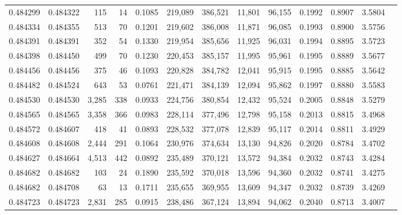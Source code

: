 \begin{tabular}{rrrrrrrrrrrrr}
0.484299 & 0.484322 &   115 &    14 &                                     0.1085 & 219,089 & 386,521 &  11,801 &  96,155 & 0.1992 & 0.8907 & 3.5804 \\
0.484334 & 0.484355 &   513 &    70 &                                     0.1201 & 219,602 & 386,008 &  11,871 &  96,085 & 0.1993 & 0.8900 & 3.5756 \\
0.484391 & 0.484391 &   352 &    54 &                                     0.1330 & 219,954 & 385,656 &  11,925 &  96,031 & 0.1994 & 0.8895 & 3.5723 \\
0.484398 & 0.484450 &   499 &    70 &                                     0.1230 & 220,453 & 385,157 &  11,995 &  95,961 & 0.1995 & 0.8889 & 3.5677 \\
0.484456 & 0.484456 &   375 &    46 &                                     0.1093 & 220,828 & 384,782 &  12,041 &  95,915 & 0.1995 & 0.8885 & 3.5642 \\
0.484482 & 0.484524 &   643 &    53 &                                     0.0761 & 221,471 & 384,139 &  12,094 &  95,862 & 0.1997 & 0.8880 & 3.5583 \\
0.484530 & 0.484530 & 3,285 &   338 &                                     0.0933 & 224,756 & 380,854 &  12,432 &  95,524 & 0.2005 & 0.8848 & 3.5279 \\
0.484565 & 0.484565 & 3,358 &   366 &                                     0.0983 & 228,114 & 377,496 &  12,798 &  95,158 & 0.2013 & 0.8815 & 3.4968 \\
0.484572 & 0.484607 &   418 &    41 &                                     0.0893 & 228,532 & 377,078 &  12,839 &  95,117 & 0.2014 & 0.8811 & 3.4929 \\
0.484608 & 0.484608 & 2,444 &   291 &                                     0.1064 & 230,976 & 374,634 &  13,130 &  94,826 & 0.2020 & 0.8784 & 3.4702 \\
0.484627 & 0.484664 & 4,513 &   442 &                                     0.0892 & 235,489 & 370,121 &  13,572 &  94,384 & 0.2032 & 0.8743 & 3.4284 \\
0.484682 & 0.484682 &   103 &    24 &                                     0.1890 & 235,592 & 370,018 &  13,596 &  94,360 & 0.2032 & 0.8741 & 3.4275 \\
0.484682 & 0.484708 &    63 &    13 &                                     0.1711 & 235,655 & 369,955 &  13,609 &  94,347 & 0.2032 & 0.8739 & 3.4269 \\
0.484723 & 0.484723 & 2,831 &   285 &                                     0.0915 & 238,486 & 367,124 &  13,894 &  94,062 & 0.2040 & 0.8713 & 3.4007 \\

\end{tabular}
